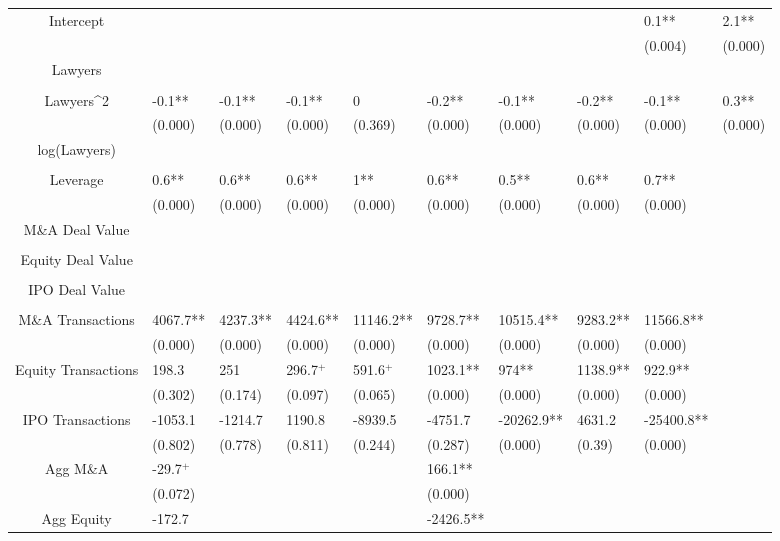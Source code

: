 \documentclass{article}
\begin{document}
\begin{table}[H]
\begin{tabular}{|clllllllll|}
Intercept &  &  &  &  &  &  &  & 0.1** & 2.1** \\ 
   &  &  &  &  &  &  &  & (0.004) & (0.000) \\ 
  Lawyers &  &  &  &  &  &  &  &  &  \\ 
   &  &  &  &  &  &  &  &  &  \\ 
  Lawyers^2 & -0.1** & -0.1** & -0.1** & 0 & -0.2** & -0.1** & -0.2** & -0.1** & 0.3** \\ 
   & (0.000) & (0.000) & (0.000) & (0.369) & (0.000) & (0.000) & (0.000) & (0.000) & (0.000) \\ 
  log(Lawyers) &  &  &  &  &  &  &  &  &  \\ 
   &  &  &  &  &  &  &  &  &  \\ 
  Leverage & 0.6** & 0.6** & 0.6** & 1** & 0.6** & 0.5** & 0.6** & 0.7** &  \\ 
   & (0.000) & (0.000) & (0.000) & (0.000) & (0.000) & (0.000) & (0.000) & (0.000) &  \\ 
  M\&A Deal Value &  &  &  &  &  &  &  &  &  \\ 
   &  &  &  &  &  &  &  &  &  \\ 
  Equity Deal Value &  &  &  &  &  &  &  &  &  \\ 
   &  &  &  &  &  &  &  &  &  \\ 
  IPO Deal Value &  &  &  &  &  &  &  &  &  \\ 
   &  &  &  &  &  &  &  &  &  \\ 
  M\&A Transactions & 4067.7** & 4237.3** & 4424.6** & 11146.2** & 9728.7** & 10515.4** & 9283.2** & 11566.8** &  \\ 
   & (0.000) & (0.000) & (0.000) & (0.000) & (0.000) & (0.000) & (0.000) & (0.000) &  \\ 
  Equity Transactions & 198.3 & 251 & 296.7$^{+}$ & 591.6$^{+}$ & 1023.1** & 974** & 1138.9** & 922.9** &  \\ 
   & (0.302) & (0.174) & (0.097) & (0.065) & (0.000) & (0.000) & (0.000) & (0.000) &  \\ 
  IPO Transactions & -1053.1 & -1214.7 & 1190.8 & -8939.5 & -4751.7 & -20262.9** & 4631.2 & -25400.8** &  \\ 
   & (0.802) & (0.778) & (0.811) & (0.244) & (0.287) & (0.000) & (0.39) & (0.000) &  \\ 
  Agg M\&A & -29.7$^{+}$ &  &  &  & 166.1** &  &  &  &  \\ 
   & (0.072) &  &  &  & (0.000) &  &  &  &  \\ 
  Agg Equity & -172.7 &  &  &  & -2426.5** &  &  &  &  \\ 

\end{tabular}
\end{table}
\end{document}

